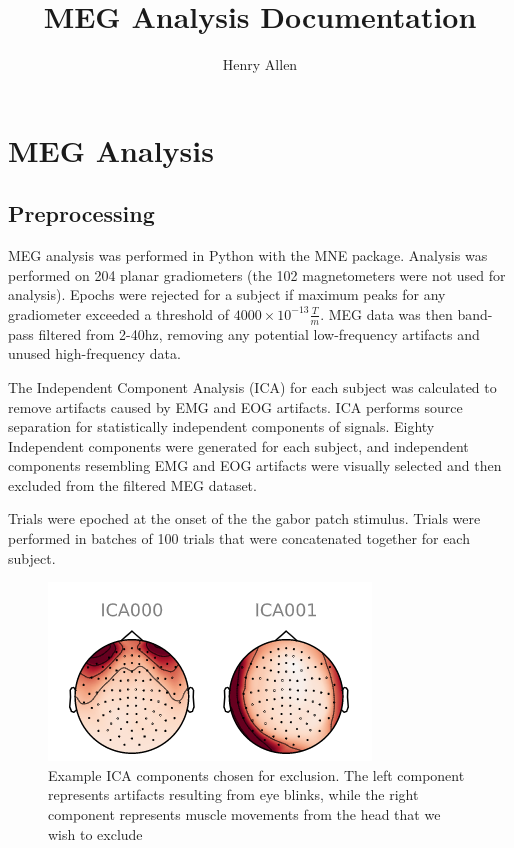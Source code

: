 \documentclass[12pt]{article}
\title{MEG Analysis Documentation}
\author{Henry Allen}
\begin{document}
\maketitle

\section{MEG Analysis}
\subsection{Preprocessing}

MEG analysis was performed in Python with the MNE package. Analysis was performed
on 204 planar gradiometers (the 102 magnetometers were not used for analysis). Epochs were rejected
for a subject if maximum peaks for any gradiometer exceeded a threshold of $4000\times10^{-13}  \frac{T}{m}$.
MEG data was then band-pass filtered from 2-40hz, removing any potential low-frequency artifacts and
unused high-frequency data.

The Independent Component Analysis (ICA) for each subject was calculated to remove artifacts caused
by EMG and EOG artifacts. ICA performs source separation for statistically independent components of signals.
Eighty Independent components were generated for each subject, and independent components resembling
EMG and EOG artifacts were visually selected and then excluded from the filtered MEG dataset.

Trials were epoched at the onset of the the gabor patch stimulus. Trials were performed in
batches of 100 trials that were concatenated together for each subject.

\begin{figure}[h]
  \centering
  \includegraphics{ica_figure.PNG}
  \caption{Example ICA components chosen for exclusion. The left component represents
  artifacts resulting from eye blinks, while the right component represents muscle
  movements from the head that we wish to exclude}
\end{figure}
\end{document}
